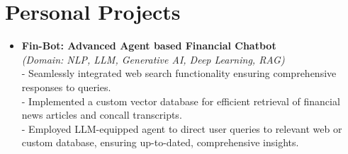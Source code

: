 \documentclass[11pt,a4paper,sans]{moderncv}
\begin{document}
\section{Personal Projects}
{\begin{itemize}[label=\textbullet]
\item {
\textbf{Fin-Bot: Advanced Agent based Financial Chatbot} \href{https://www.youtube.com/watch?v=yhfRhK09RCc}{}\\ 
\textit{(Domain: NLP, LLM, Generative AI, Deep Learning, RAG)} }
\\- Seamlessly integrated web search functionality ensuring comprehensive responses to queries.
\\- Implemented a custom vector database for efficient retrieval of financial news articles and concall transcripts.
\\- Employed LLM-equipped agent to direct user queries to relevant web or custom database, ensuring up-to-dated, comprehensive insights.
\end{itemize}}
\end{document}
